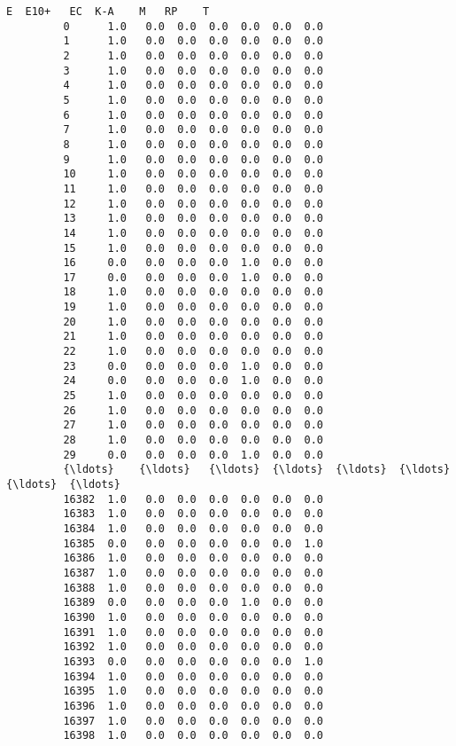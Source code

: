 \documentclass[11pt]{article}
\begin{document}
\begin{Verbatim}[commandchars=\\\{\}]
                  E  E10+   EC  K-A    M   RP    T  
         0      1.0   0.0  0.0  0.0  0.0  0.0  0.0  
         1      1.0   0.0  0.0  0.0  0.0  0.0  0.0  
         2      1.0   0.0  0.0  0.0  0.0  0.0  0.0  
         3      1.0   0.0  0.0  0.0  0.0  0.0  0.0  
         4      1.0   0.0  0.0  0.0  0.0  0.0  0.0  
         5      1.0   0.0  0.0  0.0  0.0  0.0  0.0  
         6      1.0   0.0  0.0  0.0  0.0  0.0  0.0  
         7      1.0   0.0  0.0  0.0  0.0  0.0  0.0  
         8      1.0   0.0  0.0  0.0  0.0  0.0  0.0  
         9      1.0   0.0  0.0  0.0  0.0  0.0  0.0  
         10     1.0   0.0  0.0  0.0  0.0  0.0  0.0  
         11     1.0   0.0  0.0  0.0  0.0  0.0  0.0  
         12     1.0   0.0  0.0  0.0  0.0  0.0  0.0  
         13     1.0   0.0  0.0  0.0  0.0  0.0  0.0  
         14     1.0   0.0  0.0  0.0  0.0  0.0  0.0  
         15     1.0   0.0  0.0  0.0  0.0  0.0  0.0  
         16     0.0   0.0  0.0  0.0  1.0  0.0  0.0  
         17     0.0   0.0  0.0  0.0  1.0  0.0  0.0  
         18     1.0   0.0  0.0  0.0  0.0  0.0  0.0  
         19     1.0   0.0  0.0  0.0  0.0  0.0  0.0  
         20     1.0   0.0  0.0  0.0  0.0  0.0  0.0  
         21     1.0   0.0  0.0  0.0  0.0  0.0  0.0  
         22     1.0   0.0  0.0  0.0  0.0  0.0  0.0  
         23     0.0   0.0  0.0  0.0  1.0  0.0  0.0  
         24     0.0   0.0  0.0  0.0  1.0  0.0  0.0  
         25     1.0   0.0  0.0  0.0  0.0  0.0  0.0  
         26     1.0   0.0  0.0  0.0  0.0  0.0  0.0  
         27     1.0   0.0  0.0  0.0  0.0  0.0  0.0  
         28     1.0   0.0  0.0  0.0  0.0  0.0  0.0  
         29     0.0   0.0  0.0  0.0  1.0  0.0  0.0  
         {\ldots}    {\ldots}   {\ldots}  {\ldots}  {\ldots}  {\ldots}  {\ldots}  {\ldots}  
         16382  1.0   0.0  0.0  0.0  0.0  0.0  0.0  
         16383  1.0   0.0  0.0  0.0  0.0  0.0  0.0  
         16384  1.0   0.0  0.0  0.0  0.0  0.0  0.0  
         16385  0.0   0.0  0.0  0.0  0.0  0.0  1.0  
         16386  1.0   0.0  0.0  0.0  0.0  0.0  0.0  
         16387  1.0   0.0  0.0  0.0  0.0  0.0  0.0  
         16388  1.0   0.0  0.0  0.0  0.0  0.0  0.0  
         16389  0.0   0.0  0.0  0.0  1.0  0.0  0.0  
         16390  1.0   0.0  0.0  0.0  0.0  0.0  0.0  
         16391  1.0   0.0  0.0  0.0  0.0  0.0  0.0  
         16392  1.0   0.0  0.0  0.0  0.0  0.0  0.0  
         16393  0.0   0.0  0.0  0.0  0.0  0.0  1.0  
         16394  1.0   0.0  0.0  0.0  0.0  0.0  0.0  
         16395  1.0   0.0  0.0  0.0  0.0  0.0  0.0  
         16396  1.0   0.0  0.0  0.0  0.0  0.0  0.0  
         16397  1.0   0.0  0.0  0.0  0.0  0.0  0.0  
         16398  1.0   0.0  0.0  0.0  0.0  0.0  0.0  

\end{Verbatim}
\end{document}
